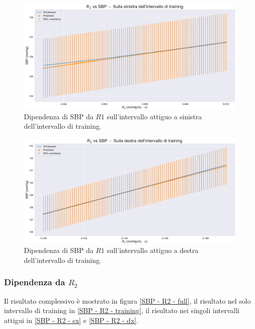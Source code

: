 \begin{figure}
    \centering
    \includegraphics[width=1\textwidth]{images/Training (risultati)/SBP/SBP - R1 - sx.pdf}
    \caption{Dipendenza di SBP da $R1$ sull'intervallo attiguo a sinistra dell'intervallo di training.}
    \label{SBP - R1 - sx}
\end{figure}



\begin{figure}
    \centering
    \includegraphics[width=1\textwidth]{images/Training (risultati)/SBP/SBP - R1 - dx.pdf}
    \caption{Dipendenza di SBP da $R1$ sull'intervallo attiguo a destra dell'intervallo di training.}
    \label{SBP - R1 - dx}
\end{figure}






\newpage
\subsubsection{Dipendenza da $R_2$}
Il risultato complessivo è mostrato in figura \ref{SBP - R2 - full}, il risultato nel solo intervallo di training in \ref{SBP - R2 - training}, il risultato nei singoli intervalli attigui in \ref{SBP - R2 - sx} e \ref{SBP - R2 - dx}.

